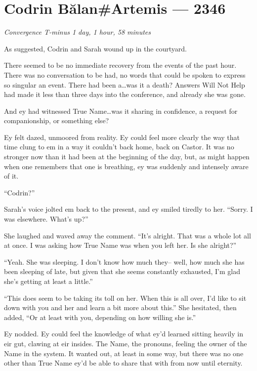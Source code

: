 \hypertarget{codrin-bux103lanartemis-2346}{%
\chapter{Codrin Bălan\#Artemis — 2346}\label{codrin-bux103lanartemis-2346}}

\begin{center}
\emph{Convergence T-minus 1 day, 1 hour, 58 minutes}
\end{center}

\noindent As suggested, Codrin and Sarah wound up in the courtyard.

There seemed to be no immediate recovery from the events of the past hour. There was no conversation to be had, no words that could be spoken to express so singular an event. There had been a\ldots{}was it a death? Answers Will Not Help had made it less than three days into the conference, and already she was gone.

And ey had witnessed True Name\ldots{}was it sharing in confidence, a request for companionship, or something else?

Ey felt dazed, unmoored from reality. Ey could feel more clearly the way that time clung to em in a way it couldn't back home, back on Castor. It was no stronger now than it had been at the beginning of the day, but, as might happen when one remembers that one is breathing, ey was suddenly and intensely aware of it.

``Codrin?''

Sarah's voice jolted em back to the present, and ey smiled tiredly to her. ``Sorry. I was elsewhere. What's up?''

She laughed and waved away the comment. ``It's alright. That was a whole lot all at once. I was asking how True Name was when you left her. Is she alright?''

``Yeah. She was sleeping. I don't know how much they-- well, how much she has been sleeping of late, but given that she seems constantly exhausted, I'm glad she's getting at least a little.''

``This does seem to be taking its toll on her. When this is all over, I'd like to sit down with you and her and learn a bit more about this.'' She hesitated, then added, ``Or at least with you, depending on how willing she is.''

Ey nodded. Ey could feel the knowledge of what ey'd learned sitting heavily in eir gut, clawing at eir insides. The Name, the pronouns, feeling the owner of the Name in the system. It wanted out, at least in some way, but there was no one other than True Name ey'd be able to share that with from now until eternity.

